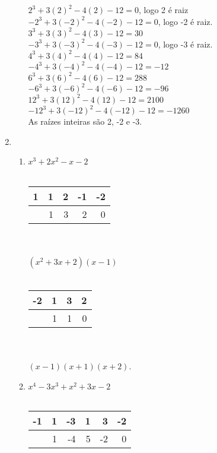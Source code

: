 \documentclass[10pt]{book}
\begin{document}
\begin{enumerate}
\begin{enumerate}
			$2^3+3(2)^2-4(2)-12=0$, logo 2 é raiz\\
			$-2^3+3(-2)^2-4(-2)-12=0$, logo -2 é raiz.\\
			$3^3+3(3)^2-4(3)-12=30$\\
			$-3^3+3(-3)^2-4(-3)-12=0$, logo -3 é raiz.\\
			$4^3+3(4)^2-4(4)-12=84$\\
			$-4^3+3(-4)^2-4(-4)-12=-12$\\
			$6^3+3(6)^2-4(6)-12=288$\\
			$-6^3+3(-6)^2-4(-6)-12=-96$\\
			$12^3+3(12)^2-4(12)-12=2100$\\
			$-12^3+3(-12)^2-4(-12)-12=-1260$\\
			As raízes inteiras são 2, -2 e -3.
		\end{enumerate}
	\setcounter{enumi}{18}
	\item %
	\begin{enumerate}
		\item %
			$x^3 + 2x^2 - x - 2$
			\\
	 		\\
			\begin{tabular}{ l | r r r r }
			  1 & 1 & 2 & -1 & -2 \\
				\hline
			    & 1 & 3 & 2 & 0 \\
			\end{tabular}
			\\
			\\
			$(x^2 + 3x + 2)(x - 1)$
			\\
			\\
			\begin{tabular}{ l | r r r }
			  -2 & 1 & 3 & 2 \\
			  \hline
			    & 1 & 1 & 0  \\
			\end{tabular}
			\\
			\\
		   $(x - 1)(x + 1)(x + 2)$.
		   \\
		\item %
			$x^4 - 3x^3 + x^2 + 3x - 2$
			\\
			\\
			\begin{tabular}{ l | r r r r r }
			   -1 & 1 & -3 & 1 & 3 & -2  \\
				\hline
			    & 1 & -4 & 5 & -2 & 0 \\
			\end{tabular}

\end{enumerate}
\end{enumerate}
\end{document}
